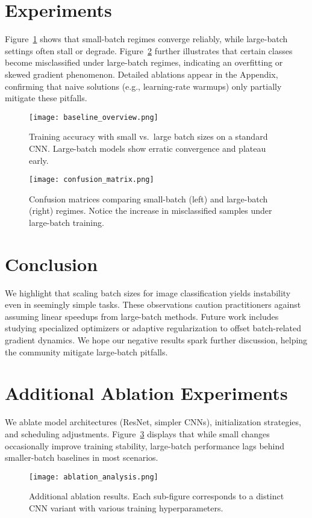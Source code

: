 \documentclass{article}
\begin{document}
\section{Experiments}
Figure~\ref{fig:baseline} shows that small-batch regimes converge reliably, while large-batch settings often stall or degrade. Figure~\ref{fig:confusion} further illustrates that certain classes become misclassified under large-batch regimes, indicating an overfitting or skewed gradient phenomenon. Detailed ablations appear in the Appendix, confirming that naive solutions (e.g., learning-rate warmups) only partially mitigate these pitfalls.

\begin{figure}[t]
\centering
\texttt{[image: baseline\_overview.png]}
\caption{Training accuracy with small vs.\ large batch sizes on a standard CNN. Large-batch models show erratic convergence and plateau early.}
\label{fig:baseline}
\end{figure}

\begin{figure}[t]
\centering
\texttt{[image: confusion\_matrix.png]}
\caption{Confusion matrices comparing small-batch (left) and large-batch (right) regimes. Notice the increase in misclassified samples under large-batch training.}
\label{fig:confusion}
\end{figure}

\section{Conclusion}
We highlight that scaling batch sizes for image classification yields instability even in seemingly simple tasks. These observations caution practitioners against assuming linear speedups from large-batch methods. Future work includes studying specialized optimizers or adaptive regularization to offset batch-related gradient dynamics. We hope our negative results spark further discussion, helping the community mitigate large-batch pitfalls.

\appendix
\section{Additional Ablation Experiments}
We ablate model architectures (ResNet, simpler CNNs), initialization strategies, and scheduling adjustments. Figure~\ref{fig:ablation} displays that while small changes occasionally improve training stability, large-batch performance lags behind smaller-batch baselines in most scenarios.

\begin{figure}[h]
\centering
\texttt{[image: ablation\_analysis.png]}
\caption{Additional ablation results. Each sub-figure corresponds to a distinct CNN variant with various training hyperparameters.}
\label{fig:ablation}
\end{figure}



\end{document}
